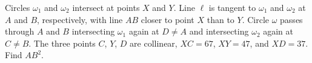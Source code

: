 Circles $\omega_1$ and $\omega_2$ intersect at points $X$ and $Y$. Line $\ell$ is tangent to $\omega_1$ and $\omega_2$ at $A$ and $B$,  respectively, with line $AB$ closer to point $X$ than to $Y$. Circle $\omega$ passes through $A$ and $B$ intersecting $\omega_1$ again at $D \neq A$ and intersecting $\omega_2$ again at $C \neq B$. The three points $C$,  $Y$,  $D$ are collinear, $XC = 67$,  $XY = 47$,  and $XD = 37$. Find $AB^2$.